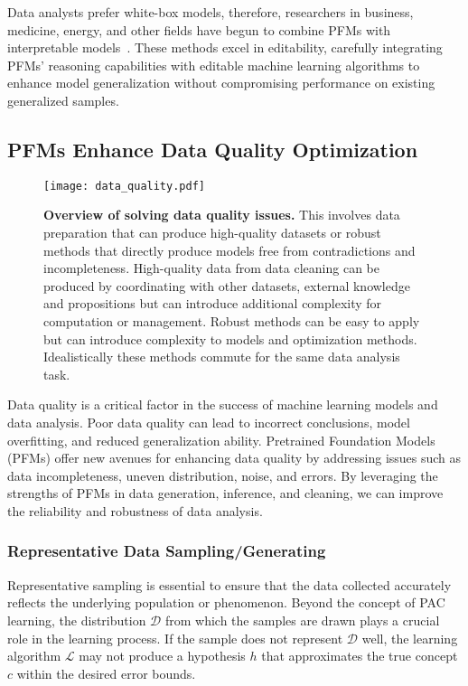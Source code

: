 Data analysts prefer white-box models, therefore, researchers in business, medicine, energy, and other fields have begun to combine PFMs with interpretable models~\cite{vertsel2024hybrid,gerussi2022llm,Zhang2024LargeLM}. These methods excel in editability, carefully integrating PFMs' reasoning capabilities with editable machine learning algorithms to enhance model generalization without compromising performance on existing generalized samples.


\subsection{PFMs Enhance Data Quality Optimization}\label{sec:data_quality}

\begin{figure*}[h]
  \centering
  \texttt{[image: data\_quality.pdf]} %
  \caption{\textbf{Overview of solving data quality issues.} This involves data preparation that can produce high-quality datasets or robust methods that directly produce models free from contradictions and incompleteness. High-quality data from data cleaning can be produced by coordinating with other datasets, external knowledge and propositions but can introduce additional complexity for computation or management. Robust methods can be easy to apply but can introduce complexity to models and optimization methods. Idealistically these methods commute for the same data analysis task.}
  \label{fig:data_quality}
\end{figure*}


Data quality is a critical factor in the success of machine learning models and data analysis. Poor data quality can lead to incorrect conclusions, model overfitting, and reduced generalization ability. Pretrained Foundation Models (PFMs) offer new avenues for enhancing data quality by addressing issues such as data incompleteness, uneven distribution, noise, and errors. By leveraging the strengths of PFMs in data generation, inference, and cleaning, we can improve the reliability and robustness of data analysis.

\subsubsection{Representative Data Sampling/Generating}

Representative sampling is essential to ensure that the data collected accurately reflects the underlying population or phenomenon. Beyond the concept of PAC learning, the distribution $\mathcal{D}$ from which the samples are drawn plays a crucial role in the learning process. If the sample does not represent $\mathcal{D}$ well, the learning algorithm $\mathcal{L}$ may not produce a hypothesis $h$ that approximates the true concept $c$ within the desired error bounds.

